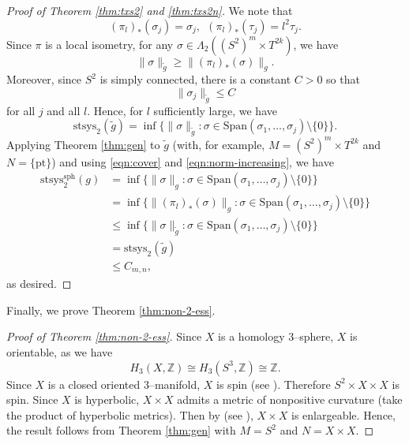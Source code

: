 \documentclass[12pt]{amsart}
\theoremstyle{definition}
\numberwithin{equation}{section}
\newcommand{\Z}{\mathbb{Z}}
\begin{document}
\begin{proof}[Proof of Theorem \ref{thm:txs2} and \ref{thm:txs2n}]
We note that
\begin{equation}\label{eqn:cover} (\pi_l)_*(\sigma_j) = \sigma_j,\ \ (\pi_l)_*(\tau_j) = l^2\tau_j. \end{equation}
Since $\pi$ is a local isometry, for any $\sigma \in \Lambda_2((S^2)^m \times T^{2k})$, we have
\begin{equation}\label{eqn:norm-increasing} \|\sigma\|_{\tilde{g}} \geq \|(\pi_l)_*(\sigma)\|_g. \end{equation}
Moreover, since $S^2$ is simply connected, there is a constant $C > 0$ so that
\[ \|\sigma_j\|_{\tilde{g}} \leq C \]
for all $j$ and all $l$. Hence, for $l$ sufficiently large, we have
\[ \mathrm{stsys}_2(\tilde{g}) = \inf\{\|\sigma\|_{\tilde{g}} : \sigma \in \mathrm{Span}(\sigma_1, \hdots, \sigma_j) \setminus \{0\}\}. \]
Applying Theorem \ref{thm:gen} to $\tilde{g}$ (with, for example, $M = (S^2)^m \times T^{2k}$ and $N = \{\mathrm{pt}\}$) and using \eqref{eqn:cover} and \eqref{eqn:norm-increasing}, we have
\begin{align*}
\mathrm{stsys}_2^{\mathrm{sph}}(g)
& = \inf\{\|\sigma\|_g : \sigma \in \mathrm{Span}(\sigma_1, \hdots, \sigma_j) \setminus \{0\}\}\\
& = \inf\{\|(\pi_l)_*(\sigma)\|_g : \sigma \in \mathrm{Span}(\sigma_1, \hdots, \sigma_j) \setminus \{0\}\}\\
& \leq \inf\{\|\sigma\|_{\tilde{g}} : \sigma \in \mathrm{Span}(\sigma_1, \hdots, \sigma_j) \setminus \{0\}\}\\
& = \mathrm{stsys}_2(\tilde{g})\\
& \leq C_{m, n},
\end{align*}
as desired.
\end{proof}

Finally, we prove Theorem \ref{thm:non-2-ess}.

\begin{proof}[Proof of Theorem \ref{thm:non-2-ess}]
Since $X$ is a homology 3--sphere, $X$ is orientable, as we have
\[ H_3(X,\Z) \cong H_3(S^3, \Z) \cong \Z. \]
Since $X$ is a closed oriented 3--manifold, $X$ is spin (see \cite[Chapter II, Example 2.3]{Lawson-Michelson:spin}). Therefore $S^2 \times X \times X$ is spin. Since $X$ is hyperbolic, $X \times X$ admits a metric of nonpositive curvature (take the product of hyperbolic metrics). Then by \cite{Gromov-Lawson:closed} (see \cite[Chapter IV, Theorem 5.4(B)]{Lawson-Michelson:spin}), $X \times X$ is enlargeable. Hence, the result follows from Theorem \ref{thm:gen} with $M = S^2$ and $N = X \times X$.
\end{proof}
\end{document}
